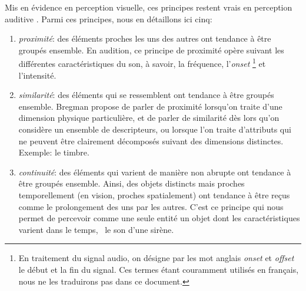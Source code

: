 Mis en évidence en perception visuelle, ces principes restent vrais en perception auditive \citep[ch. 1]{bregman1994auditory}. Parmi ces principes, nous en détaillons ici cinq:

\begin{enumerate}
\item \emph{proximité}: des éléments proches les uns des autres ont tendance à être groupés ensemble. En audition, ce principe de proximité opère suivant les différentes caractéristiques du son, à savoir, la fréquence, l'\emph{onset} \footnote{En traitement du signal audio, on désigne par les mot anglais \emph{onset} et \emph{offset} le début et la fin du signal. Ces termes étant couramment utilisés en français, nous ne les traduirons pas dans ce document.} et l'intensité.
 
\item \emph{similarité}: des éléments qui se ressemblent ont tendance à être groupés ensemble. 
 Bregman propose de parler de proximité lorsqu'on traite d'une dimension physique particulière, et de parler de similarité dès lors qu'on considère un ensemble de descripteurs, ou lorsque l'on traite d'attributs qui ne peuvent être clairement décomposés suivant des dimensions distinctes. Exemple: le timbre.
\item \emph{continuité}: des éléments qui varient de manière non abrupte ont tendance à être groupés ensemble. Ainsi, des objets distincts mais proches temporellement (en vision, proches spatialement) ont tendance à être reçus comme le prolongement des uns par les autres. C'est ce principe qui nous permet de percevoir comme une seule entité un objet dont les caractéristiques varient dans le temps, \eg~le son d'une sirène. 

\end{enumerate}
